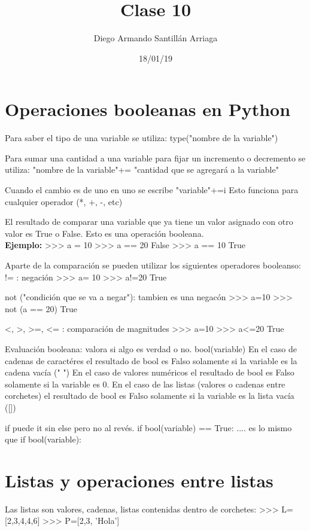 \documentclass[letterpaper, 12pt, oneside]{article}%
\title{\Huge Clase 10}
\author{Diego Armando Santillán Arriaga}
\date{18/01/19}
\begin{document}
\maketitle
\newpage
\section{Operaciones booleanas en Python}
 
Para saber el tipo de una variable se utiliza:
type("nombre de la variable")

Para sumar una cantidad a una variable para fijar un incremento
o decremento se utiliza: 
"nombre de la variable"+= "cantidad que se agregará a la variable"

Cuando el cambio es de uno en uno se escribe "variable"+=i
Esto funciona para cualquier operador (*, +, -, etc)

El resultado de comparar una variable que ya tiene un valor asignado con
otro valor es True o False. Esto es una operación booleana. 
\\
\textbf{Ejemplo:}
>>> a = 10
>>> a == 20
False
>>> a == 10
True

Aparte de la comparación se pueden utilizar los siguientes operadores booleanso:
 != : negación
 >>> a= 10
 >>> a!=20
 True
 
 not ("condición que se va a negar"): tambien es una negacón
 >>> a=10
 >>> not (a == 20)
 True
 
 <, >, >=, <= : comparación de magnitudes
 >>> a=10
 >>> a<=20
 True
 
 Evaluación booleana: valora si algo es verdad o no. 
 bool(variable)
 En el caso de cadenas de caractéres el resultado de bool es Falso solamente
 si la variable es la cadena vacía (" ")
 En el caso de valores numéricos el resultado de bool es Falso solamente
 si la variable es 0.
 En el caso de las listas (valores o cadenas entre corchetes) el resultado de bool es Falso solamente si la variable es la lista vacía ([])
 
 if puede it sin else pero no al revés.
 if bool(variable) == True: .... es lo mismo que if bool(variable):
 
\section{Listas y operaciones entre listas}

Las listas son valores, cadenas, listas contenidas dentro de corchetes:
>>> L=[2,3,4,4,6]
>>> P=[2,3, 'Hola']
\end{document}
